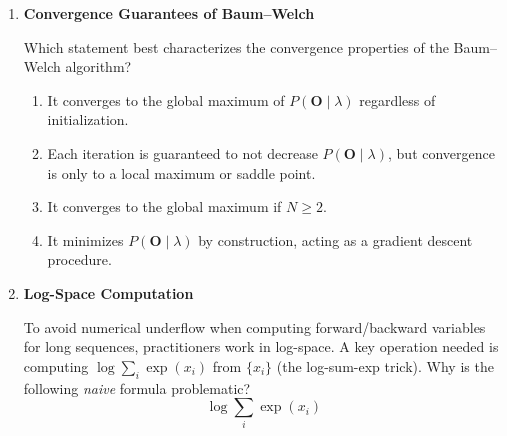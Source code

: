 \documentclass[12pt]{article}
\begin{document}
\begin{enumerate}[label=\textbf{Q\arabic*.}, leftmargin=*, itemsep=2em]
\begin{enumerate}[label=\Alph*.]
    \item $\displaystyle \hat{b}_j(k)
          = \frac{\displaystyle\sum_{t=1}^{T}\mathbf{1}[o_t=v_k]\,\gamma_t(j)}
                 {\displaystyle\sum_{t=1}^{T}\gamma_t(j)}$
    \item $\displaystyle \hat{b}_j(k)
          = \frac{\displaystyle\sum_{t=1}^{T}\mathbf{1}[o_t=v_k]\,\gamma_t(j)}
                 {\displaystyle\sum_{k'=1}^{M}\sum_{t=1}^{T}\mathbf{1}[o_t=v_{k'}]}$
    \item $\displaystyle \hat{b}_j(k)
          = \frac{\displaystyle\sum_{t=1}^{T}\gamma_t(j)}
                 {\displaystyle\sum_{t=1}^{T}\mathbf{1}[o_t=v_k]\,\gamma_t(j)}$
    \item $\displaystyle \hat{b}_j(k)
          = \mathbf{1}[o_t = v_k]\,\gamma_t(j)$
          for any $t$ with $o_t = v_k$
\end{enumerate}

\item \textbf{Convergence Guarantees of Baum--Welch}

Which statement best characterizes the convergence properties of the Baum--Welch
algorithm?

\begin{enumerate}[label=\Alph*.]
    \item It converges to the global maximum of $P(\mathbf{O}\mid\lambda)$
          regardless of initialization.
    \item Each iteration is guaranteed to not decrease $P(\mathbf{O}\mid\lambda)$,
          but convergence is only to a local maximum or saddle point.
    \item It converges to the global maximum if $N \geq 2$.
    \item It minimizes $P(\mathbf{O}\mid\lambda)$ by construction, acting as
          a gradient descent procedure.
\end{enumerate}

\item \textbf{Log-Space Computation}

To avoid numerical underflow when computing forward/backward variables for long
sequences, practitioners work in log-space. A key operation needed is computing
$\log\!\sum_i \exp(x_i)$ from $\{x_i\}$ (the log-sum-exp trick). Why is the
following \emph{naive} formula problematic?
\[
    \log\!\sum_i \exp(x_i)
\]


\end{enumerate}
\end{document}
